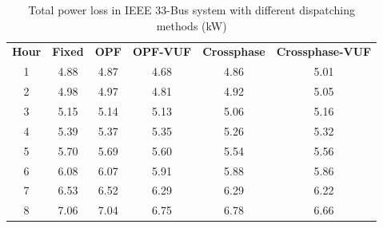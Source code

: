 \documentclass[journal]{IEEEtran}
\begin{document}
\begin{center}
\begin{table}
\caption{Total power loss in IEEE 33-Bus system with different dispatching methods (kW)}
\label{Table5}
\centering

\begin{tabular}{c|c|c|c|c|c}
    \hline\hline
    \multirow{2}[0]{*}{\textbf{Hour}} &  \multirow{2}[0]{*}{\textbf{Fixed}} & \multirow{2}[0]{*}{\textbf{OPF}} & \multirow{2}[0]{*}{\textbf{OPF-VUF}} & \multirow{2}[0]{*}{\textbf{Crossphase}} & \multirow{2}[0]{5em}{\textbf{Crossphase-VUF}} \\ & & & & & \\ \hline
    1 & 4.88 & 4.87 & 4.68 & 4.86 & 5.01\\ 
    \hline
    2 & 4.98 & 4.97 & 4.81 & 4.92 & 5.05\\ 
    \hline
    3 & 5.15 & 5.14 & 5.13 & 5.06 & 5.16\\ 
    \hline
    4 & 5.39 & 5.37 & 5.35 & 5.26 & 5.32\\ 
    \hline
    5 & 5.70 & 5.69 & 5.60 & 5.54 & 5.56\\ 
    \hline
    6 & 6.08 & 6.07 & 5.91 & 5.88 & 5.86\\ 
    \hline
    7 & 6.53 & 6.52 & 6.29 & 6.29 & 6.22\\ 
    \hline
    8 & 7.06 & 7.04 & 6.75 & 6.78 & 6.66\\ 
    \hline\hline
    \end{tabular}

\end{table}
\end{center}


\end{document}
